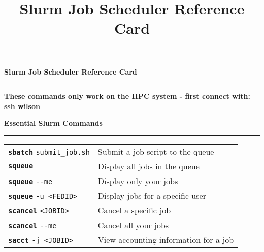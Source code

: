 \documentclass[11pt, a4paper, landscape]{article}
\title{Slurm Job Scheduler Reference Card}
\date{}
\newcommand{\slcmd}[1]{\textcolor{mainblue}{\texttt{\textbf{#1}}}}
\newcommand{\slopt}[1]{\textcolor{optiongreen}{\texttt{#1}}}
\begin{document}
\begin{center}
\Large\textbf{Slurm Job Scheduler Reference Card}
\end{center}
\vspace{-2mm}
\noindent\rule{\linewidth}{3pt}

\vspace{4mm}

\begin{tcolorbox}[colback=lightblue, colframe=mainblue, boxrule=2pt, arc=5mm, left=5mm, right=5mm, top=3mm, bottom=3mm]
\centering
\normalsize\textbf{These commands only work on the HPC system - first connect with: ssh wilson}
\end{tcolorbox}

\vspace{3mm}

\begin{tcolorbox}[colback=white, colframe=bordercolor, boxrule=1pt, arc=5mm, left=4mm, right=4mm, top=4mm, bottom=4mm]
\textbf{\large Essential Slurm Commands}\\[-3mm]
\textcolor{mainblue}{\rule{\dimexpr\linewidth-8mm\relax}{2pt}}
\vspace{2mm}

\small
\begin{tabular}{@{}p{}p{}@{}}
\slcmd{sbatch} \slopt{submit\_job.sh} & Submit a job script to the queue \\[1.5mm]
\slcmd{squeue} & Display all jobs in the queue \\[1.5mm]
\slcmd{squeue} \slopt{-{}-me} & Display only your jobs \\[1.5mm]
\slcmd{squeue} \slopt{-u <FEDID>} & Display jobs for a specific user \\[1.5mm]
\slcmd{scancel} \slopt{<JOBID>} & Cancel a specific job \\[1.5mm]
\slcmd{scancel} \slopt{-{}-me} & Cancel all your jobs \\[1.5mm]
\slcmd{sacct} \slopt{-j <JOBID>} & View accounting information for a job \\[1.5mm]
\end{tabular}
\end{tcolorbox}

\vspace{2.5mm}
\end{document}
